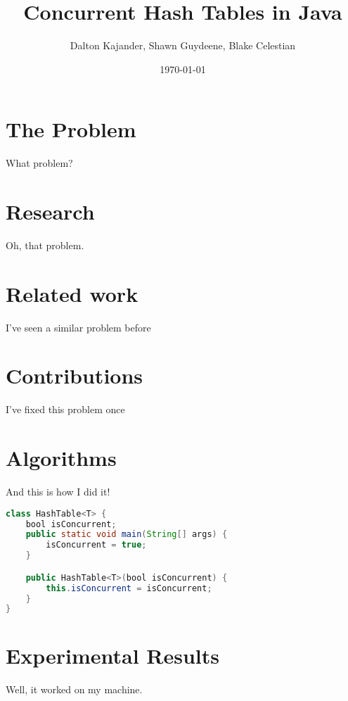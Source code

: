 \documentclass{article}
\begin{document}
\author{Dalton Kajander, Shawn Guydeene, Blake Celestian}
\title{Concurrent Hash Tables in Java}
\date{\today{}}
\maketitle

\newpage
\tableofcontents
\newpage

\section{The Problem}
What problem?

\section{Research}
Oh, that problem.

\section{Related work}
I've seen a similar problem before

\section{Contributions}
I've fixed this problem once

\section{Algorithms}
And this is how I did it!
\begin{lstlisting}[language={Java},caption=Testing surce code in \LaTeX{}.,breaklines=true,frame=single]
class HashTable<T> {
    bool isConcurrent;
    public static void main(String[] args) {
        isConcurrent = true;
    }

    public HashTable<T>(bool isConcurrent) {
        this.isConcurrent = isConcurrent;
    }
}
\end{lstlisting}

\section{Experimental Results}
Well, it worked on my machine. 



\newpage
\end{document}
